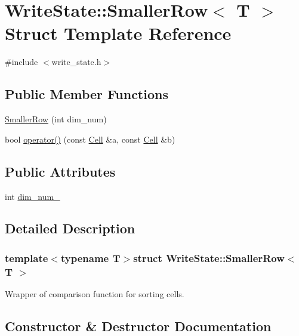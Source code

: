 \hypertarget{structWriteState_1_1SmallerRow}{}\section{Write\+State\+:\+:Smaller\+Row$<$ T $>$ Struct Template Reference}
\label{structWriteState_1_1SmallerRow}


{\ttfamily \#include $<$write\+\_\+state.\+h$>$}

\subsection*{Public Member Functions}
\begin{DoxyCompactItemize}
\item 
\hyperlink{structWriteState_1_1SmallerRow_a89e1a59e123c09ca2dd5eae9adbf7413}{Smaller\+Row} (int dim\+\_\+num)
\item 
bool \hyperlink{structWriteState_1_1SmallerRow_ae185197a685ae2ef7bc4b0f21cccade6}{operator()} (const \hyperlink{structWriteState_1_1Cell}{Cell} \&a, const \hyperlink{structWriteState_1_1Cell}{Cell} \&b)
\end{DoxyCompactItemize}
\subsection*{Public Attributes}
\begin{DoxyCompactItemize}
\item 
int \hyperlink{structWriteState_1_1SmallerRow_abf13c9a4bddfec91cb28e4ed5e299ba9}{dim\+\_\+num\+\_\+}
\end{DoxyCompactItemize}


\subsection{Detailed Description}
\subsubsection*{template$<$typename T$>$struct Write\+State\+::\+Smaller\+Row$<$ T $>$}

Wrapper of comparison function for sorting cells. 

\subsection{Constructor \& Destructor Documentation}
\hypertarget{structWriteState_1_1SmallerRow_a89e1a59e123c09ca2dd5eae9adbf7413}{}
